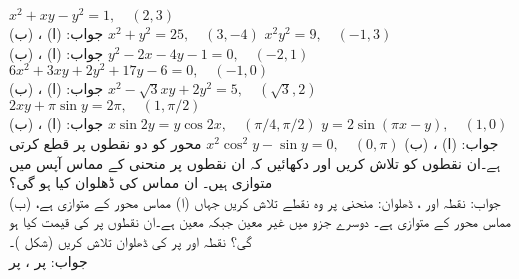 $x^2+xy-y^2=1,\quad (2,3)$\\
جواب:\quad
(ا)  ، (ب) 
$x^2+y^2=25,\quad (3,-4)$
$x^2y^2=9,\quad (-1,3)$\\
جواب:\quad
(ا) ، (ب) 
$y^2-2x-4y-1=0,\quad (-2,1)$
$6x^2+3xy+2y^2+17y-6=0,\quad (-1,0)$\\
جواب:\quad
(ا) ، (ب) 
$x^2-\sqrt{3}xy+2y^2=5,\quad (\sqrt{3},2)$
$2xy+\pi\sin y=2\pi,\quad (1,\pi/2)$\\
جواب:\quad
(ا) ، (ب) 
$x\sin 2y=y\cos 2x,\quad (\pi/4,\pi/2)$
$y=2\sin(\pi x-y),\quad (1,0)$\\
جواب:\quad
(ا) ، (ب) 
$x^2\cos^2y-\sin y=0,\quad (0,\pi)$
 محور کو  دو نقطوں پر قطع کرتی ہے۔ان نقطوں کو تلاش کریں اور دکھائیں کہ ان نقطوں پر منحنی کے مماس آپس میں متوازی ہیں۔ ان مماس کی ڈھلوان کیا ہو گی؟\\
جواب:\quad
نقطہ  اور ، ڈھلوان:
منحنی  پر وہ نقطے تلاش کریں جہاں (ا) مماس  محور کے متوازی ہے، (ب) مماس  محور کے متوازی ہے۔ دوسرے جزو میں  غیر معین جبکہ  معین ہے۔ان نقطوں پر  کی قیمت کیا ہو گی؟ 
\quad
نقطہ  اور  پر  کی ڈھلوان تلاش کریں (شکل )۔\\
جواب:\quad
{} پر ،  پر 
